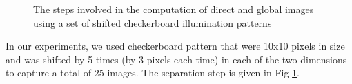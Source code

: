 \begin{figure}[t]
\centering
{}
\caption{The steps involved in the computation of direct and
global images using a set of shifted checkerboard illumination patterns}\label{fig:16}
\end{figure}





In our experiments, we used checkerboard pattern that were 10x10 pixels in
size and was shifted by 5 times (by 3 pixels each time) in each of
the two dimensions to capture a total of 25 images. The separation
step is given in Fig \ref{fig:16}.

